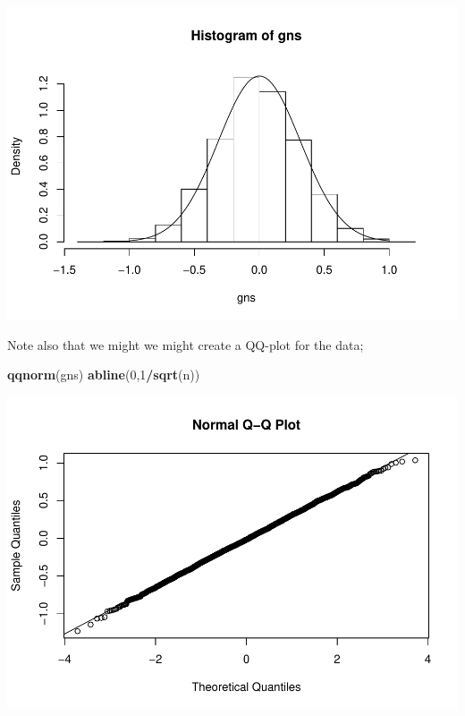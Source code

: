\documentclass[
]{article}
\newenvironment{Shaded}{\begin{snugshade}}{\end{snugshade}}
\newcommand{\DecValTok}[1]{\textcolor[rgb]{0.00,0.00,0.81}{#1}}
\newcommand{\KeywordTok}[1]{\textcolor[rgb]{0.13,0.29,0.53}{\textbf{#1}}}
\newcommand{\NormalTok}[1]{#1}
\newcommand{\OperatorTok}[1]{\textcolor[rgb]{0.81,0.36,0.00}{\textbf{#1}}}
\begin{document}
\begin{center}\includegraphics{matstatproblems20-21_files/figure-latex/unnamed-chunk-27-1} \end{center}

Note also that we might we might create a QQ-plot for the data;

\begin{Shaded}
\begin{Highlighting}[]
\KeywordTok{qqnorm}\NormalTok{(gns)}
\KeywordTok{abline}\NormalTok{(}\DecValTok{0}\NormalTok{,}\DecValTok{1}\OperatorTok{/}\KeywordTok{sqrt}\NormalTok{(n))}
\end{Highlighting}
\end{Shaded}

\begin{center}\includegraphics{matstatproblems20-21_files/figure-latex/unnamed-chunk-28-1} \end{center}
\end{document}
